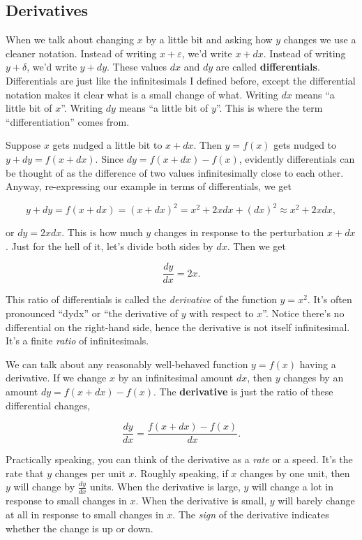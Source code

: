 \documentclass[
  letterpaper,
  DIV=11,
  numbers=noendperiod]{scrreprt}
\begin{document}
\hypertarget{derivatives}{%
\subsection{Derivatives}\label{derivatives}}

When we talk about changing \(x\) by a little bit and asking how \(y\)
changes we use a cleaner notation. Instead of writing
\(x + \varepsilon\), we'd write \(x + dx\). Instead of writing
\(y + \delta\), we'd write \(y + dy\). These values \(dx\) and \(dy\)
are called \textbf{differentials}. Differentials are just like the
infinitesimals I defined before, except the differential notation makes
it clear what is a small change of what. Writing \(dx\) means ``a little
bit of \(x\)''. Writing \(dy\) means ``a little bit of \(y\)''. This is
where the term ``differentiation'' comes from.

Suppose \(x\) gets nudged a little bit to \(x+dx\). Then \(y=f(x)\) gets
nudged to \(y+dy=f(x+dx)\). Since \(dy=f(x+dx)-f(x)\), evidently
differentials can be thought of as the difference of two values
infinitesimally close to each other. Anyway, re-expressing our example
in terms of differentials, we get

\[y + dy = f(x+dx) = (x + dx)^2 = x^2 + 2xdx + (dx)^2 \approx x^2 + 2xdx,\]

or \(dy=2xdx\). This is how much \(y\) changes in response to the
perturbation \(x+dx\). Just for the hell of it, let's divide both sides
by \(dx\). Then we get

\[\frac{dy}{dx} = 2x.\]

This ratio of differentials is called the \emph{derivative} of the
function \(y=x^2\). It's often pronounced ``dydx'' or ``the derivative
of \(y\) with respect to \(x\)''. Notice there's no differential on the
right-hand side, hence the derivative is not itself infinitesimal. It's
a finite \emph{ratio} of infinitesimals.

We can talk about any reasonably well-behaved function \(y=f(x)\) having
a derivative. If we change \(x\) by an infinitesimal amount \(dx\), then
\(y\) changes by an amount \(dy=f(x+dx)-f(x)\). The \textbf{derivative}
is just the ratio of these differential changes,

\[\frac{dy}{dx} = \frac{f(x+dx)-f(x)}{dx}.\]

Practically speaking, you can think of the derivative as a \emph{rate}
or a speed. It's the rate that \(y\) changes per unit \(x\). Roughly
speaking, if \(x\) changes by one unit, then \(y\) will change by
\(\frac{dy}{dx}\) units. When the derivative is large, \(y\) will change
a lot in response to small changes in \(x\). When the derivative is
small, \(y\) will barely change at all in response to small changes in
\(x\). The \emph{sign} of the derivative indicates whether the change is
up or down.
\end{document}
